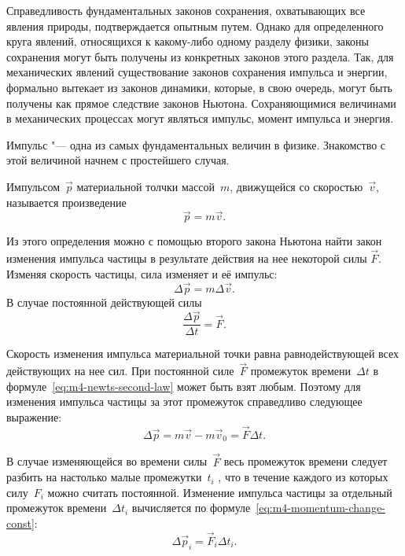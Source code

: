 \documentclass[a4paper, 12pt]{extarticle}
\begin{document}
Справедливость фундаментальных законов сохранения, охватывающих все явления природы, подтверждается опытным путем. Однако для определенного круга явлений, относящихся к какому-либо одному разделу физики, законы сохранения могут быть получены из конкретных законов этого раздела. Так, для механических явлений существование законов сохранения импульса и энергии, формально вытекает из законов динамики, которые, в свою очередь, могут быть получены как прямое следствие законов Ньютона. %
Сохраняющимися величинами в механических процессах могут являться импульс, момент импульса и энергия.

Импульс "--- одна из самых фундаментальных величин в физике. Знакомство с этой величиной начнем с простейшего случая.

Импульсом~$\vec p$ материальной толчки массой~$m$, движущейся со скоростью~$\vec v$, называется произведение
\begin{equation}
\label{eq:m4-momentum-definition}
\vec p = m \vec v.
\end{equation}

Из этого определения можно с помощью второго закона Ньютона найти закон изменения импульса частицы в результате действия на нее некоторой силы $\vec F$. Изменяя скорость частицы, сила изменяет и её импульс: \[
\Delta \vec p = m \Delta \vec v.
\] %
В случае постоянной действующей силы
\begin{equation}
\label{eq:m4-newts-second-law}
\frac{\Delta \vec p}{\Delta t} = \vec F.
\end{equation}

Скорость изменения импульса материальной точки равна равнодействующей всех действующих на нее сил. При постоянной силе~$\vec F$ промежуток времени~$\Delta t$ в формуле~\eqref{eq:m4-newts-second-law} может быть взят любым. Поэтому для изменения импульса частицы за этот промежуток справедливо
следующее выражение:
\begin{equation}
\label{eq:m4-momentum-change-const}
\Delta \vec p = m \vec v - m \vec v_0 = \vec F \Delta t.
\end{equation}

В случае изменяющейся во времени силы~$\vec F$ весь промежуток времени следует разбить на настолько малые промежутки~$t_i$ , что в течение каждого из которых силу~$F_i$ можно считать постоянной. %
Изменение импульса частицы за отдельный промежуток времени~$\Delta t_i$ вычисляется по формуле~\eqref{eq:m4-momentum-change-const}:
\begin{equation}
\label{eq:m4-momentary-momentum-change}
\Delta \vec p_i = \vec F_i \Delta t_i.
\end{equation}
\end{document}
